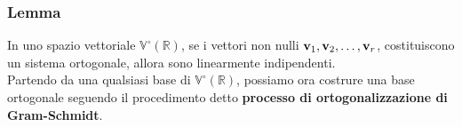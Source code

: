 \documentclass[../main.tex]{subfiles}
\begin{document}
\subsubsection{Lemma}
In uno spazio vettoriale $\mathbb{V}^{\circ}(\mathbb{R})$, se i vettori non nulli $\textbf{v}_1, \textbf{v}_2, \ldots, \textbf{v}_{r}$, costituiscono un sistema ortogonale, allora sono linearmente indipendenti.\\
Partendo da una qualsiasi base di $\mathbb{V}^{\circ}(\mathbb{R})$, possiamo ora costrure una base ortogonale seguendo il procedimento detto \textbf{processo di ortogonalizzazione di Gram-Schmidt}.\\
\end{document}
